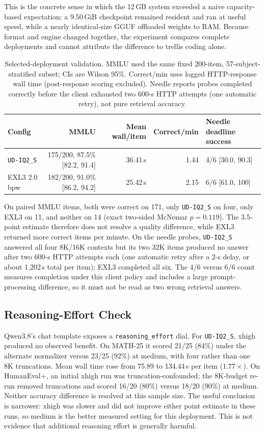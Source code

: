 \documentclass[11pt]{article}
\newcommand{\q}[1]{\texttt{#1}}
\begin{document}
This is the concrete sense in which the 12\,GB system exceeded a naive
capacity-based expectation: a 9.50\,GiB checkpoint remained resident and ran
at useful speed, while a nearly identical-size GGUF offloaded weights to RAM.
Because format and engine changed together, the experiment compares complete
deployments and cannot attribute the difference to trellis coding alone.

\begin{table}[t]
\centering
\small
\caption{Selected-deployment validation. MMLU used the same fixed 200-item,
57-subject-stratified subset; CIs are Wilson 95\%. Correct/min uses logged
HTTP-response wall time (post-response scoring excluded). Needle reports
probes completed correctly
before the client exhausted two 600-s HTTP attempts (one automatic retry),
not pure retrieval accuracy.}
\label{tab:validation}
\setlength{\tabcolsep}{5pt}
\begin{tabular}{lrrrl}
\toprule
Config & MMLU & Mean wall/item & Correct/min & Needle deadline success \\
\midrule
\q{UD-IQ2\_S} & 175/200, 87.5\% [82.2, 91.4] & 36.41\,s & 1.44 & 4/6 [30.0, 90.3] \\
EXL3 2.0\,bpw & 182/200, 91.0\% [86.2, 94.2] & 25.42\,s & 2.15 & 6/6 [61.0, 100] \\
\bottomrule
\end{tabular}
\end{table}

On paired MMLU items, both were correct on 171, only \q{UD-IQ2\_S} on four,
only EXL3 on 11, and neither on 14 (exact two-sided McNemar $p{=}0.119$).
The 3.5-point estimate therefore does not resolve a quality difference, while
EXL3 returned more correct items per minute. On the needle probes,
\q{UD-IQ2\_S} answered all four 8K/16K contexts but its two 32K items produced
no answer after two 600-s HTTP attempts each (one automatic retry after a
2-s delay, or about 1,202\,s total per item); EXL3 completed all six. The
4/6 versus 6/6 count measures completion under this client policy and includes
a large prompt-processing difference, so it must not be read as two wrong
retrieval answers.


\subsection{Reasoning-Effort Check}
\label{sec:effort}

Qwen3.8's chat template exposes a \q{reasoning\_effort} dial. For
\q{UD-IQ2\_S}, xhigh produced no observed benefit. On MATH-25 it scored
21/25 (84\%) under the alternate normalizer versus 23/25 (92\%) at medium,
with four rather than one 8K truncations. Mean wall time rose from 75.89 to
134.44\,s per item ($1.77\times$). On HumanEval+, an initial xhigh run was
truncation-confounded; the 8K-budget re-run removed truncations and scored
16/20 (80\%) versus 18/20 (90\%) at medium. Neither accuracy difference is
resolved at this sample size. The useful conclusion is narrower: xhigh was
slower and did not improve either point estimate in these runs, so medium is
the better measured setting for this deployment. This is not evidence that
additional reasoning effort is generally harmful.
\end{document}
